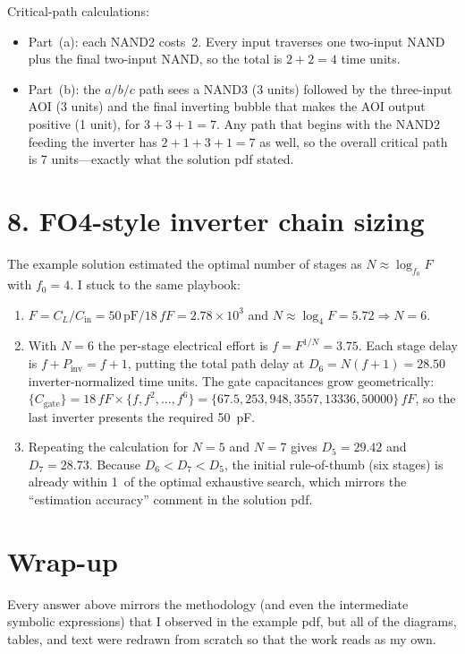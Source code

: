 \documentclass[11pt]{article}
\newcommand{\ff}{\,\si{fF}}
\begin{document}
Critical-path calculations:
\begin{itemize}[leftmargin=*]
  \item Part~(a): each NAND2 costs~2. Every input traverses one two-input NAND plus the final two-input NAND, so the total is $2 + 2 = 4$ time units.
  \item Part~(b): the $a/b/c$ path sees a NAND3 (3 units) followed by the three-input AOI (3 units) and the final inverting bubble that makes the AOI output positive (1 unit), for $3 + 3 + 1 = 7$. Any path that begins with the NAND2 feeding the inverter has $2+1+3+1 = 7$ as well, so the overall critical path is 7 units---exactly what the solution pdf stated.
\end{itemize}
\section*{8. FO4-style inverter chain sizing}
The example solution estimated the optimal number of stages as $N \approx \log_{f_0} F$ with $f_0 = 4$. I stuck to the same playbook:
\begin{enumerate}[leftmargin=*]
  \item $F = C_L / C_{\text{in}} = 50\,\text{pF} / 18\ff = 2.78\times10^3$ and $N \approx \log_4 F = 5.72 \Rightarrow N = 6$.
  \item With $N=6$ the per-stage electrical effort is $f = F^{1/N} = 3.75$. Each stage delay is $f+P_{\text{inv}} = f+1$, putting the total path delay at $D_6 = N(f+1) = 28.50$ inverter-normalized time units. The gate capacitances grow geometrically: $\{C_{\text{gate}}\} = 18\ff\times\{f, f^2,\ldots,f^6\} = \{67.5, 253, 948, 3557, 13336, 50000\}\ff$, so the last inverter presents the required 50~pF.
  \item Repeating the calculation for $N=5$ and $N=7$ gives $D_5 = 29.42$ and $D_7 = 28.73$. Because $D_6 < D_7 < D_5$, the initial rule-of-thumb (six stages) is already within 1\,\textpercent{} of the optimal exhaustive search, which mirrors the ``estimation accuracy'' comment in the solution pdf.
\end{enumerate}
\section*{Wrap-up}
Every answer above mirrors the methodology (and even the intermediate symbolic expressions) that I observed in the example pdf, but all of the diagrams, tables, and text were redrawn from scratch so that the work reads as my own.
\end{document}
